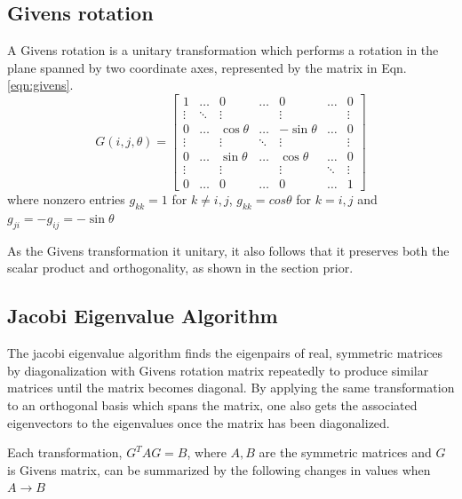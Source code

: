 \documentclass[10pt,showpacs,preprintnumbers,footinbib,amsmath,amssymb,aps,prl,twocolumn,groupedaddress,superscriptaddress,showkeys]{revtex4-1}
\begin{document}
\subsection{Givens rotation}
  A Givens rotation is a unitary transformation which performs a rotation in the plane spanned by two coordinate axes, represented by the matrix in Eqn. \ref{eqn:givens}.
  \begin{equation}
    \label{eqn:givens}
    G(i, j, \theta) = 
    \begin{bmatrix}
      1 & \dots & 0 & \dots & 0 & \dots & 0 \\
      \vdots & \ddots & \vdots & & \vdots & & \vdots \\
      0 &\dots & \cos\theta & \dots  & - \sin \theta & \dots & 0 \\
      \vdots && \vdots & \ddots & \vdots && \vdots \\
      0 & \dots & \sin \theta & \dots & \cos \theta & \dots & 0 \\
      \vdots && \vdots && \vdots & \ddots & \vdots \\
      0 & \dots & 0 & \dots & 0 & \dots & 1
    \end{bmatrix}
  \end{equation}
  where nonzero entries $g_{kk}=1$ for $k\neq i,j$, $g_{kk}=cos\theta$ for $k=i,j$ and $g_{ji} = -g_{ij} = -\sin \theta$ \cite{givens}

  As the Givens transformation it unitary, it also follows that it preserves both the scalar product and orthogonality, as shown in the section prior.

\subsection{Jacobi Eigenvalue Algorithm \label{subsec:jacobi_algo}}
    The jacobi eigenvalue algorithm finds the eigenpairs of real, symmetric matrices by diagonalization with Givens rotation matrix repeatedly to produce similar matrices until the matrix becomes diagonal. By applying the same transformation to an orthogonal basis which spans the matrix, one also gets the associated eigenvectors to the eigenvalues once the matrix has been diagonalized.

    Each transformation, $G^T A G = B$, where $A, B$ are the symmetric matrices and $G$ is Givens matrix, can be summarized by the following changes in values when $A \rightarrow B$
\end{document}
